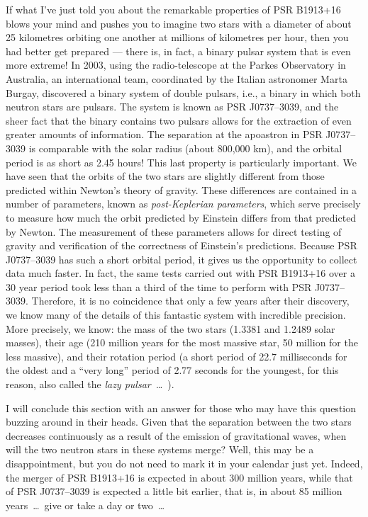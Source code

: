 If what I've just told you about the remarkable properties of PSR
B1913+16 blows your mind and pushes you to imagine two stars with a
diameter of about 25 kilometres orbiting one another at millions of kilometres per hour,
then you had better get prepared --- there is, in fact, a binary pulsar system that is
even more extreme! In 2003, using the radio-telescope at the Parkes
Observatory in Australia, an international team, coordinated by the Italian astronomer
Marta Burgay, discovered a binary system of double pulsars, i.e., a
binary in which both neutron stars are pulsars. The system is known as PSR
J0737--3039, and the sheer fact that the binary contains two pulsars
allows for the extraction of even greater amounts of information. The separation at the
apoastron in PSR J0737--3039 is comparable with the solar radius
(about 800,000 km), and the orbital period is as short as 2.45 hours! This last property
is particularly important. We have seen that the orbits of the two stars are slightly
different from those predicted within Newton's theory of gravity. These differences are
contained in a number of parameters, known as \emph{post-Keplerian
parameters}, which serve precisely to measure how
much the orbit predicted by Einstein differs from that predicted by Newton. The
measurement of these parameters allows for direct testing of gravity and verification of
the correctness of Einstein's predictions. Because PSR J0737--3039 has such a short
orbital period, it gives us the opportunity to collect data much faster. In fact, the
same tests carried out with PSR B1913+16 over a 30 year period took less than a third of
the time to perform with PSR J0737--3039. Therefore, it is no coincidence that only a
few years after their discovery, we know many of the details of this fantastic system
with incredible precision. More precisely, we know: the mass of the two stars (1.3381
and 1.2489 solar masses), their age (210 million years for the most massive star, 50
million for the less massive), and their rotation period (a short period of 22.7
milliseconds for the oldest and a ``very long'' period of 2.77 seconds for the youngest,
for this reason, also called the \emph{lazy pulsar~}\ldots~).

I will conclude this section with an answer for those who may have this question buzzing
around in their heads. Given that the separation between the two stars decreases
continuously as a result of the emission of gravitational waves, when will the two
neutron stars in these systems merge? Well, this may be a disappointment, but you do not
need to mark it in your calendar just yet. Indeed, the merger of PSR
B1913+16 is expected in about 300 million years, while that of PSR
J0737--3039 is expected a little bit earlier, that is, in about 85
million years~\ldots~give or take a day or two~\ldots{}

